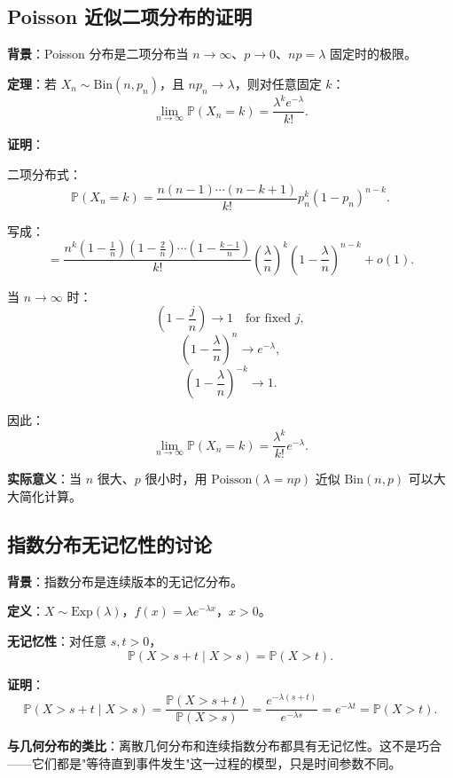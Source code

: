 \subsection{Poisson 近似二项分布的证明}

\textbf{背景}：Poisson 分布是二项分布当 $n \to \infty$、$p \to 0$、$np = \lambda$ 固定时的极限。

\textbf{定理}：若 $X_n \sim \text{Bin}(n, p_n)$，且 $np_n \to \lambda$，则对任意固定 $k$：
\[
\lim_{n \to \infty} \mathbb{P}(X_n = k) = \frac{\lambda^k e^{-\lambda}}{k!}.
\]

\textbf{证明}：

二项分布式：
\[
\mathbb{P}(X_n = k) = \frac{n(n-1)\cdots(n-k+1)}{k!} p_n^k (1-p_n)^{n-k}.
\]

写成：
\[
= \frac{n^k\left(1-\frac{1}{n}\right)\left(1-\frac{2}{n}\right)\cdots\left(1-\frac{k-1}{n}\right)}{k!} \left(\frac{\lambda}{n}\right)^k \left(1-\frac{\lambda}{n}\right)^{n-k} + o(1).
\]

当 $n \to \infty$ 时：
\[
\left(1-\frac{j}{n}\right) \to 1 \quad \text{for fixed } j,
\]
\[
\left(1-\frac{\lambda}{n}\right)^{n} \to e^{-\lambda},
\]
\[
\left(1-\frac{\lambda}{n}\right)^{-k} \to 1.
\]

因此：
\[
\lim_{n \to \infty} \mathbb{P}(X_n = k) = \frac{\lambda^k}{k!} e^{-\lambda}.
\]

\textbf{实际意义}：当 $n$ 很大、$p$ 很小时，用 $\text{Poisson}(\lambda = np)$ 近似 $\text{Bin}(n, p)$ 可以大大简化计算。

\subsection{指数分布无记忆性的讨论}\label{sec:derivation-exponential-memoryless}

\textbf{背景}：指数分布是连续版本的无记忆分布。

\textbf{定义}：$X \sim \text{Exp}(\lambda)$，$f(x) = \lambda e^{-\lambda x}$，$x > 0$。

\textbf{无记忆性}：对任意 $s, t > 0$，
\[
\mathbb{P}(X > s+t \mid X > s) = \mathbb{P}(X > t).
\]

\textbf{证明}：
\[
\mathbb{P}(X > s+t \mid X > s) = \frac{\mathbb{P}(X > s+t)}{\mathbb{P}(X > s)} = \frac{e^{-\lambda(s+t)}}{e^{-\lambda s}} = e^{-\lambda t} = \mathbb{P}(X > t).
\]

\textbf{与几何分布的类比}：离散几何分布和连续指数分布都具有无记忆性。这不是巧合——它们都是"等待直到事件发生"这一过程的模型，只是时间参数不同。

